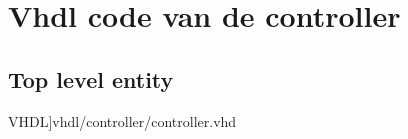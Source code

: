 \chapter[VHDL code]{Vhdl code van de controller}
\section{Top level entity}
\scriptsize 
  VHDL]{vhdl/controller/controller.vhd}
 \normalsize
\label{code:sram_ent}
